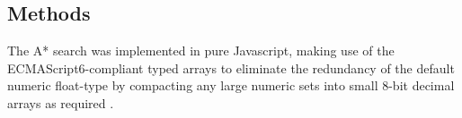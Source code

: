 \begin{methods}
\section{Methods}


The A* search was implemented in pure Javascript, making use of the ECMAScript6-compliant typed arrays to eliminate the redundancy of the default numeric float-type by compacting any large numeric sets into small 8-bit decimal arrays as required \citep{ecmascript2011}.







\end{methods}